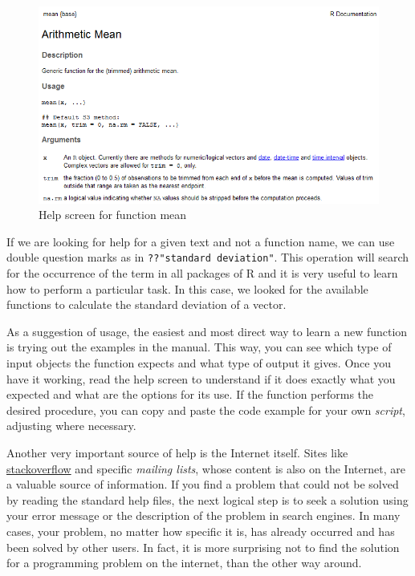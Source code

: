 \documentclass[11pt,]{book}
\begin{document}
\begin{figure}[!htbp]

{\centering \includegraphics[width=1\linewidth]{figs/ExemploAjuda} 

}

\caption{Help screen for function mean}\label{fig:ExampleHelp}
\end{figure}

If we are looking for help for a given text and not a function name, we
can use double question marks as in \texttt{??"standard\ deviation"}.
This operation will search for the occurrence of the term in all
packages of R and it is very useful to learn how to perform a particular
task. In this case, we looked for the available functions to calculate
the standard deviation of a vector.

As a suggestion of usage, the easiest and most direct way to learn a new
function is trying out the examples in the manual. This way, you can see
which type of input objects the function expects and what type of output
it gives. Once you have it working, read the help screen to understand
if it does exactly what you expected and what are the options for its
use. If the function performs the desired procedure, you can copy and
paste the code example for your own \emph{script}, adjusting where
necessary.

Another very important source of help is the Internet itself. Sites like
\href{http://stackoverflow.com/}{stackoverflow} and specific
\emph{mailing lists}, whose content is also on the Internet, are a
valuable source of information. If you find a problem that could not be
solved by reading the standard help files, the next logical step is to
seek a solution using your error message or the description of the
problem in search engines. In many cases, your problem, no matter how
specific it is, has already occurred and has been solved by other users.
In fact, it is more surprising not to find the solution for a
programming problem on the internet, than the other way around.
\end{document}
